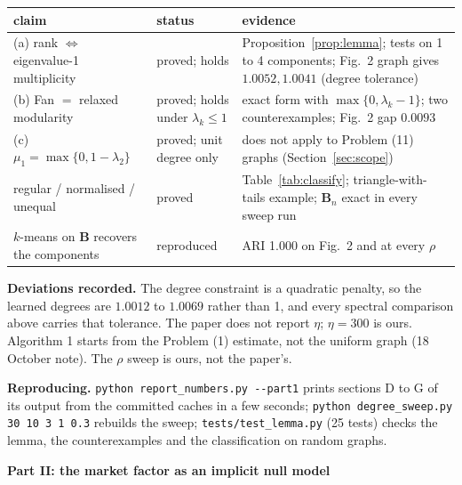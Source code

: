 \documentclass[11pt,a4paper]{article}
\newcommand{\Bmat}{\mathbf{B}}
\theoremstyle{remark}
\begin{document}
\begin{center}
\small
\begin{tabular}{>{\raggedright\arraybackslash}p{4.5cm}>{\raggedright\arraybackslash}p{2.4cm}>{\raggedright\arraybackslash}p{7.8cm}}
\toprule
claim & status & evidence \\
\midrule
(a) rank $\Leftrightarrow$ eigenvalue-1 multiplicity & proved; holds & Proposition~\ref{prop:lemma}; tests on 1 to 4 components; Fig.~2 graph gives $1.0052,1.0041$ (degree tolerance) \\
(b) Fan $=$ relaxed modularity & proved; holds under $\lambda_k\le1$ & exact form with $\max\{0,\lambda_k-1\}$; two counterexamples; Fig.~2 gap $0.0093$ \\
(c) $\mu_1=\max\{0,1-\lambda_2\}$ & proved; unit degree only & does not apply to Problem (11) graphs (Section~\ref{sec:scope}) \\
regular / normalised / unequal & proved & Table~\ref{tab:classify}; triangle-with-tails example; $\Bmat_n$ exact in every sweep run \\
$k$-means on $\Bmat$ recovers the components & reproduced & ARI 1.000 on Fig.~2 and at every $\rho$ \\
\bottomrule
\end{tabular}
\end{center}

\textbf{Deviations recorded.} The degree constraint is a quadratic penalty, so the
learned degrees are $1.0012$ to $1.0069$ rather than 1, and every spectral comparison
above carries that tolerance. The paper does not report $\eta$; $\eta=300$ is ours.
Algorithm 1 starts from the Problem (1) estimate, not the uniform graph (18 October
note). The $\rho$ sweep is ours, not the paper's.

\textbf{Reproducing.} \texttt{python report\_numbers.py -{}-part1} prints sections D to G of
its output from the committed caches in a few seconds; \texttt{python degree\_sweep.py 30 10 3 1
0.3} rebuilds the sweep; \texttt{tests/test\_lemma.py} (25 tests) checks the lemma, the
counterexamples and the classification on random graphs.

\clearpage
\begin{center}
{\Large\textbf{Part II: the market factor as an implicit null model}}
\end{center}
\vspace{1mm}
\end{document}
